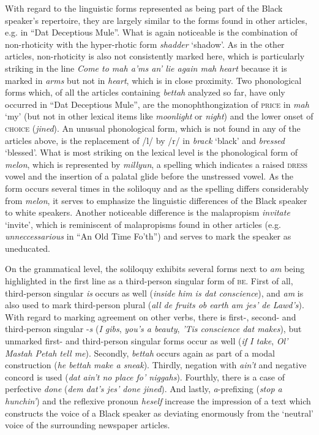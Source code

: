 With regard to the linguistic forms represented as being part of the Black speaker’s repertoire, they are largely similar to the forms found in other articles, e.g. in “Dat Deceptious Mule”. What is again noticeable is the combination of non-rhoticity with the hyper-rhotic form \emph{shadder} ‘shadow’. As in the other articles, non-rhoticity is also not consistently marked here, which is particularly striking in the line \emph{Come to mah a’ms an’ lie again mah heart} because it is marked in \emph{arms} but not in \emph{heart}, which is in close proximity. Two phonological forms which, of all the articles containing \emph{bettah} analyzed so far, have only occurred in “Dat Deceptious Mule”, are the monophthongization of \textsc{price} in \emph{mah} ‘my’ (but not in other lexical items like \emph{moonlight} or \emph{night}) and the lower onset of \textsc{choice} (\emph{jined}). An unusual phonological form, which is not found in any of the articles above, is the replacement of /l/ by /r/ in \emph{brack} ‘black’ and \emph{bressed} ‘blessed’. What is most striking on the lexical level is the phonological form of \emph{melon}, which is represented by \emph{millyun}, a spelling which indicates a raised \textsc{dress} vowel and the insertion of a palatal glide before the unstressed vowel. As the form occurs several times in the soliloquy and as the spelling differs considerably from \emph{melon}, it serves to emphasize the linguistic differences of the Black speaker to white speakers. Another noticeable difference is the malapropism \emph{invitate} ‘invite’, which is reminiscent of malapropisms found in other articles (e.g. \emph{unneccessarious} in “An Old Time Fo’th”) and serves to mark the speaker as uneducated.

On the grammatical level, the soliloquy exhibits several forms next to \emph{am} being highlighted in the first line as a third-person singular form of \textsc{be}. First of all, third-person singular \emph{is} occurs as well (\emph{inside him is dat conscience}), and \emph{am} is also used to mark third-person plural (\emph{all de fruits ob earth am jes’ de Lawd’s}). With regard to marking agreement on other verbs, there is first-, second- and third-person singular -\emph{s} (\emph{I gibs}, \emph{you’s a beauty}, \emph{’Tis conscience dat makes}), but unmarked first- and third-person singular forms occur as well (\emph{if I take}, \emph{Ol’ Mastah Petah tell me}). Secondly, \emph{bettah} occurs again as part of a modal construction (\emph{he bettah make a sneak}). Thirdly, negation with \emph{ain’t} and negative concord is used (\emph{dat ain’t no place fo’ niggahs}). Fourthly, there is a case of perfective \emph{done} (\emph{dem dat’s jes’ done jined}). And lastly, \emph{a}{}-prefixing (\emph{stop a hunchin’}) and the reflexive pronoun \emph{heself} increase the impression of a text which constructs the voice of a Black speaker as deviating enormously from the ‘neutral’ voice of the surrounding newspaper articles.


